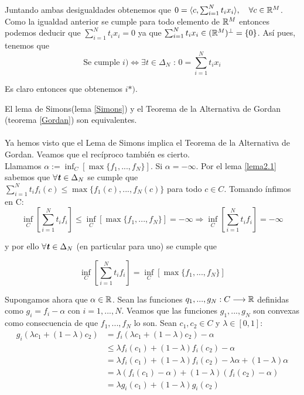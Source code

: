 	Juntando ambas desigualdades obtenemos que $ 0 =  \langle c, \sum_{i=1}^{N}{t_i x_i}\rangle, \quad \forall c \in \mathbb{R}^M $. Como la igualdad anterior se cumple para todo elemento de $ \mathbb{R}^M $ entonces podemos deducir que $ \sum_{i=1}^{N}{t_i x_i} = 0 $	ya que $ \sum_{i=1}^{N}{t_i x_i} \in (\mathbb{R}^M)^{\perp} = \{0\} $. Así pues, tenemos que
	\begin{equation*}
		\text{Se cumple }i) \Longleftrightarrow \exists t \in \Delta_N \text{ : }  0 = \sum_{i=1}^{N}{t_i x_i}
	\end{equation*} 	
	
	Es claro entonces que obtenemos $ i*) $.
	
	\begin{observacion}
		El lema de Simons(lema \ref{Simons}) y el Teorema de la Alternativa de Gordan (teorema \ref{Gordan}) son equivalentes.
	\end{observacion}

	\paragraph{} Ya hemos visto que el Lema de Simons implica el Teorema de la Alternativa de Gordan. Veamos que el recíproco también es cierto.  \\
	
	Llamamos $ \alpha := \inf_{C}\left[ \max \lbrace f_1, ..., f_N \rbrace \right] $. Si $ \alpha = -\infty $. Por el lema \ref{lema2.1} sabemos que $ \forall \textbf{\emph{t}} \in \Delta_N $ se cumple que $ \sum_{i=1}^{N} t_i f_i(c) \leq \max \lbrace f_1 (c), ... , f_N (c) \rbrace$ para todo $ c \in C$. Tomando ínfimos en C:
	\[
	\inf_C\left[ \sum_{i=1}^{N} t_i f_i \right] \leq \inf_C \left[ \max \lbrace f_1, ..., f_N \rbrace \right] = -\infty \Longrightarrow \inf_C\left[ \sum_{i=1}^{N} t_i f_i \right] = -\infty 
	\]
	
	y por ello $ \forall \textbf{\emph{t}} \in \Delta_N $ (en particular para uno) se cumple que
	
	\[
	\inf_C\left[ \sum_{i=1}^{N} t_i f_i \right] = \inf_C \left[ \max \lbrace f_1, ..., f_N \rbrace \right] \]

	Supongamos ahora que $ \alpha \in \mathbb{R} $. Sean las funciones $ q_1, ..., g_N: C \longrightarrow \mathbb{R} $ definidas como $ g_i = f_i - \alpha $ con $ i=1,...,N$. Veamos que las funciones $ g_1, ..., g_N $ son convexas como consecuencia de que $ f_1, ..., f_N $ lo son. Sean $ c_1,c_2 \in C $ y $ \lambda \in \left[0,1\right] $:
	\begin{equation*}
	\begin{split}
	g_i(\lambda c_1 + (1-\lambda) c_2) &= f_i(\lambda c_1 + (1-\lambda) c_2) - \alpha \\
	&\leq \lambda f_i(c_1) + (1-\lambda)f_i(c_2) - \alpha \\
	&= \lambda f_i(c_1) + (1-\lambda)f_i(c_2) - \lambda \alpha + (1-\lambda)\alpha \\
	&= \lambda( f_i(c_1) - \alpha ) + (1-\lambda) (f_i (c_2) - \alpha) \\
	&= \lambda g_i(c_1) + (1-\lambda) g_i (c_2)
	\end{split}
	\end{equation*}
	
